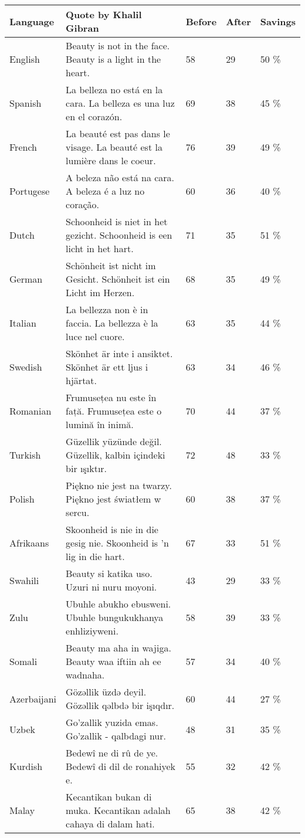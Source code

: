 \documentclass[]{article}
\begin{document}
\begin{center}
	\begin{tabular}{ | p{} | p{} | p{} | p{} | p{} |} \hline

		\textbf {Language} & \textbf{Quote by Khalil Gibran} & \textbf{Before} & \textbf{After} & \textbf{Savings} \\ \hline
		English & Beauty is not in the face. Beauty is a light in the heart. & 58 & 29 & 50 \% \\ \hline
		Spanish & La belleza no está en la cara. La belleza es una luz en el corazón. & 69 & 38 & 45 \% \\ \hline
		French & La beauté est pas dans le visage. La beauté est la lumière dans le coeur. & 76 & 39 & 49 \% \\ \hline
		Portugese & A beleza não está na cara. A beleza é a luz no coração. & 60 & 36 & 40 \% \\ \hline
		Dutch & Schoonheid is niet in het gezicht. Schoonheid is een licht in het hart. & 71 & 35 & 51 \% \\ \hline
		German & Schönheit ist nicht im Gesicht. Schönheit ist ein Licht im Herzen. & 68 & 35 & 49 \% \\ \hline
		Italian & La bellezza non è in faccia. La bellezza è la luce nel cuore. & 63 & 35 & 44 \% \\ \hline
		Swedish & Skönhet är inte i ansiktet. Skönhet är ett ljus i hjärtat. & 63 & 34 & 46 \% \\ \hline
		Romanian & Frumusețea nu este în față. Frumusețea este o lumină în inimă. & 70 & 44 & 37 \% \\ \hline
		Turkish & Güzellik yüzünde değil. Güzellik, kalbin içindeki bir ışıktır. & 72 & 48 & 33 \% \\ \hline
		Polish & Piękno nie jest na twarzy. Piękno jest światłem w sercu. & 60 & 38 & 37 \% \\ \hline
		Afrikaans & Skoonheid is nie in die gesig nie. Skoonheid is 'n lig in die hart. & 67 & 33 & 51 \% \\ \hline
		Swahili & Beauty si katika uso. Uzuri ni nuru moyoni. & 43 & 29 & 33 \% \\ \hline
		Zulu & Ubuhle abukho ebusweni. Ubuhle bungukukhanya enhliziyweni. & 58 & 39 & 33 \% \\ \hline
		Somali & Beauty ma aha in wajiga. Beauty waa iftiin ah ee wadnaha. & 57 & 34 & 40 \% \\ \hline
		Azerbaijani & Gözəllik üzdə deyil. Gözəllik qəlbdə bir işıqdır. & 60 & 44 & 27 \% \\ \hline
		Uzbek & Go'zallik yuzida emas. Go'zallik - qalbdagi nur. & 48 & 31 & 35 \% \\ \hline
		Kurdish & Bedewî ne di rû de ye. Bedewî di dil de ronahiyek e. & 55 & 32 & 42 \% \\ \hline
		Malay & Kecantikan bukan di muka. Kecantikan adalah cahaya di dalam hati. & 65 & 38 & 42 \% \\ \hline
	\end{tabular}
\end{center}
\end{document}
